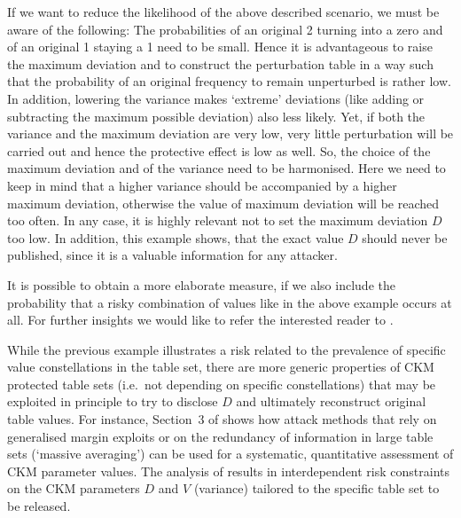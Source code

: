 If we want to reduce the likelihood of the above described scenario, we must be aware of the following: The probabilities of an original 2 turning into a zero and of an original 1 staying a 1 need to be small. Hence it is advantageous to raise the maximum deviation and to construct the perturbation table in a way such that the probability of an original frequency to remain unperturbed is rather low. In addition, lowering the variance makes ‘extreme’ deviations (like adding or subtracting the maximum possible deviation) also less likely.
Yet, if both the variance and the maximum deviation are very low, very little perturbation will be carried out and hence the protective effect is low as well. So, the choice of the maximum deviation and of the variance need to be harmonised. Here we need to keep in mind that a higher variance should be accompanied by a higher maximum deviation, otherwise the value of maximum deviation will be reached too often. In any case, it is highly relevant not to set the maximum deviation $D$ too low. In addition, this example shows, that the exact value $D$ should never be published, since it is a valuable information for any attacker.

It is possible to obtain a more elaborate measure, if we also include the probability that a risky combination of values like in the above example occurs at all. For further insights we would like to refer the interested reader to \cite{ckm_enderle_psd2020}.


While the previous example illustrates a risk related to the prevalence of specific value constellations in the table set,
there are more generic properties of CKM protected table sets (i.e.\ not depending on specific constellations) that may be exploited in principle to try to disclose $D$ and ultimately reconstruct original table values. For instance, Section~3 of \cite{ckm_bach_2021} shows how attack methods that rely on generalised margin exploits or on the redundancy of information in large table sets (`massive averaging') can be used for a systematic, quantitative assessment of CKM parameter values.  The analysis of \cite{ckm_bach_2021} results in interdependent risk constraints on the CKM parameters $D$ and $V$ (variance) tailored to the specific table set to be released.

